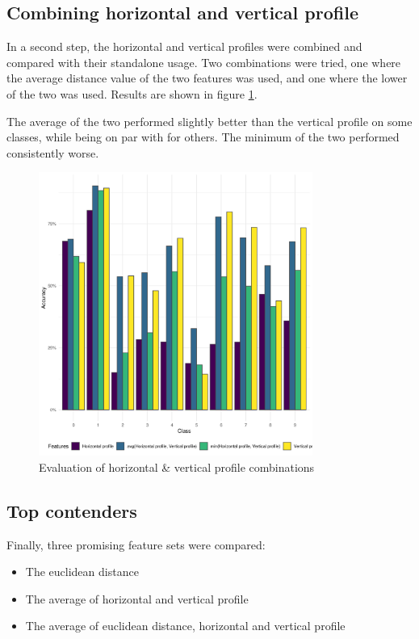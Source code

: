 \documentclass[a4paper]{scrreprt}
\begin{document}
\subsection{Combining horizontal and vertical profile}

In a second step, the horizontal and vertical profiles were combined and
compared with their standalone usage. Two combinations were tried, one where
the average distance value of the two features was used, and one where the
lower of the two was used. Results are shown in figure
\ref{fig:evaluation_profiles}.

The average of the two performed slightly better than the vertical profile on
some classes, while being on par with for others. The minimum of the two
performed consistently worse.

\begin{figure}[h]
        \centering
		\includegraphics[width=0.8\textwidth]{resources/features_profiles.png}
		\caption{Evaluation of horizontal \& vertical profile combinations}
		\label{fig:evaluation_profiles}
\end{figure}

\subsection{Top contenders}

Finally, three promising feature sets were compared:
\begin{itemize}
		\item The euclidean distance
		\item The average of horizontal and vertical profile
		\item The average of euclidean distance, horizontal and vertical profile
\end{itemize}
\end{document}
